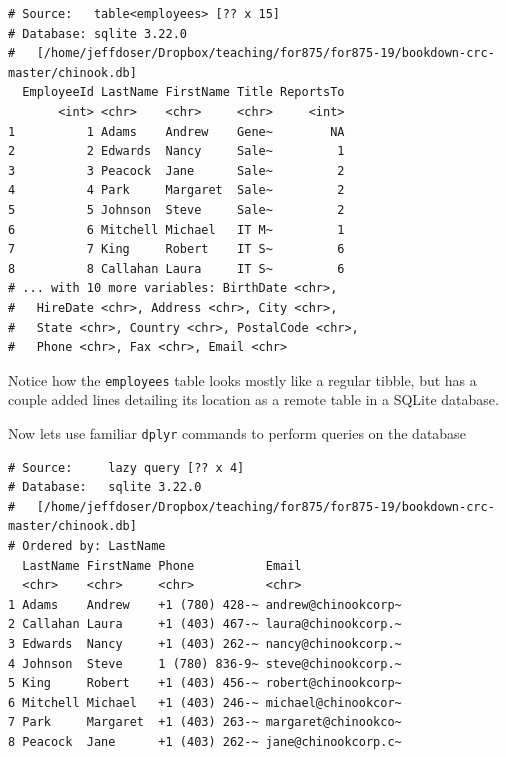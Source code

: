 \documentclass[]{krantz}
\makeatletter
\newenvironment{Shaded}{\begin{snugshade}}{\end{snugshade}}
\newcommand{\KeywordTok}[1]{\textcolor[rgb]{0.27,0.27,0.27}{\textbf{#1}}}
\newcommand{\NormalTok}[1]{#1}
\newcommand{\OperatorTok}[1]{\textcolor[rgb]{0.43,0.43,0.43}{\textbf{#1}}}
\newcommand{\StringTok}[1]{\textcolor[rgb]{0.5,0.5,0.5}{#1}}
\newenvironment{kframe}{%
\medskip{}
\setlength{\fboxsep}{.8em}
 \def\at@end@of@kframe{}%
 \ifinner\ifhmode%
  \def\at@end@of@kframe{\end{minipage}}%
  \begin{minipage}{\columnwidth}%
 \fi\fi%
 \def\FrameCommand##1{\hskip\@totalleftmargin \hskip-\fboxsep
 \colorbox{shadecolor}{##1}\hskip-\fboxsep
     \hskip-\linewidth \hskip-\@totalleftmargin \hskip\columnwidth}%
 \MakeFramed {\advance\hsize-\width
   \@totalleftmargin\z@ \linewidth\hsize
   \@setminipage}}%
 {\par\unskip\endMakeFramed%
 \at@end@of@kframe}
\renewenvironment{Shaded}{\begin{kframe}}{\end{kframe}}
\makeatother
\begin{document}
\begin{verbatim}
# Source:   table<employees> [?? x 15]
# Database: sqlite 3.22.0
#   [/home/jeffdoser/Dropbox/teaching/for875/for875-19/bookdown-crc-master/chinook.db]
  EmployeeId LastName FirstName Title ReportsTo
       <int> <chr>    <chr>     <chr>     <int>
1          1 Adams    Andrew    Gene~        NA
2          2 Edwards  Nancy     Sale~         1
3          3 Peacock  Jane      Sale~         2
4          4 Park     Margaret  Sale~         2
5          5 Johnson  Steve     Sale~         2
6          6 Mitchell Michael   IT M~         1
7          7 King     Robert    IT S~         6
8          8 Callahan Laura     IT S~         6
# ... with 10 more variables: BirthDate <chr>,
#   HireDate <chr>, Address <chr>, City <chr>,
#   State <chr>, Country <chr>, PostalCode <chr>,
#   Phone <chr>, Fax <chr>, Email <chr>
\end{verbatim}

Notice how the \texttt{employees} table looks mostly like a regular tibble, but has a couple added lines detailing its location as a remote table in a SQLite database.

Now lets use familiar \texttt{dplyr} commands to perform queries on the database

\begin{Shaded}
\end{Shaded}

\begin{verbatim}
# Source:     lazy query [?? x 4]
# Database:   sqlite 3.22.0
#   [/home/jeffdoser/Dropbox/teaching/for875/for875-19/bookdown-crc-master/chinook.db]
# Ordered by: LastName
  LastName FirstName Phone          Email              
  <chr>    <chr>     <chr>          <chr>              
1 Adams    Andrew    +1 (780) 428-~ andrew@chinookcorp~
2 Callahan Laura     +1 (403) 467-~ laura@chinookcorp.~
3 Edwards  Nancy     +1 (403) 262-~ nancy@chinookcorp.~
4 Johnson  Steve     1 (780) 836-9~ steve@chinookcorp.~
5 King     Robert    +1 (403) 456-~ robert@chinookcorp~
6 Mitchell Michael   +1 (403) 246-~ michael@chinookcor~
7 Park     Margaret  +1 (403) 263-~ margaret@chinookco~
8 Peacock  Jane      +1 (403) 262-~ jane@chinookcorp.c~
\end{verbatim}
\end{document}
